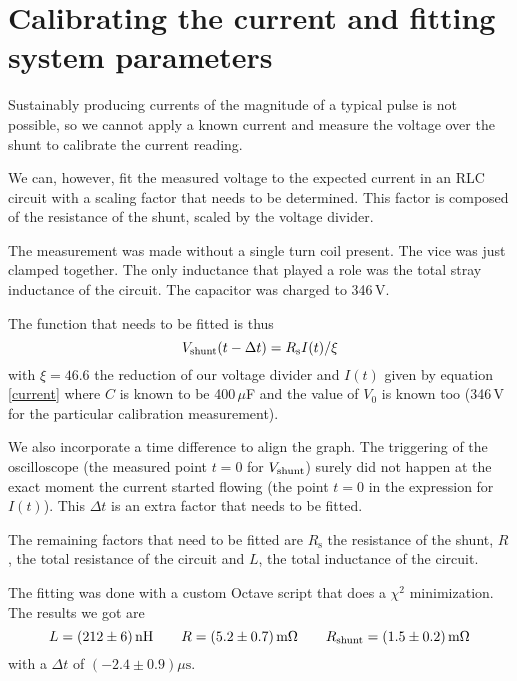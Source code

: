 
\section{Calibrating the current and fitting system parameters 
\label{secIcalib}}
Sustainably producing currents of the magnitude of a typical pulse is not 
possible, so we cannot apply a known current and measure the voltage over 
the shunt to calibrate the current reading.

We can, however, fit the measured voltage to the expected current in an RLC 
circuit with a scaling factor that needs to be determined. This factor is 
composed of the resistance of the shunt, scaled by the voltage divider. 

The measurement was made without a single turn coil present. The vice was 
just clamped together. The only inductance that played a role was the total 
stray inductance of the circuit. The capacitor was charged to 346\,V.

The function that needs to be fitted is thus
$$
V_\mathrm{shunt}(t - \Delta t) = R_\mathrm s I(t) / \xi
$$
with $\xi = 46.6$ the reduction of our voltage divider and $I(t)$ given by 
equation \ref{current} where $C$ is known to be 400\,$\mu$F and the value 
of $V_0$ is known too (346\,V for the particular calibration measurement).

We also incorporate a time difference to align the graph. The triggering of 
the oscilloscope (the measured point $t = 0$ for $V_\mathrm{shunt}$) surely did not 
happen at the exact moment the current started flowing (the point $t = 0$ 
in the expression for $I(t)$). This $\Delta t$ is an extra factor that 
needs to be fitted.

The remaining factors that need to be fitted are $R_\mathrm s$ the 
resistance of the shunt, $R$, the total resistance of the circuit and $L$, 
the total inductance of the circuit.

The fitting was done with a custom Octave script that does a $\chi^2$ 
minimization. The results we got are
$$
L = (212 \pm 6)\,\mathrm{nH}
\qquad
R = (5.2 \pm 0.7)\,\mathrm{m}\Omega
\qquad
R_\mathrm{shunt} = (1.5 \pm 0.2)\,\mathrm{m}\Omega
$$
with a $\Delta t$ of $(-2.4 \pm 0.9)\mu\mathrm s$.






